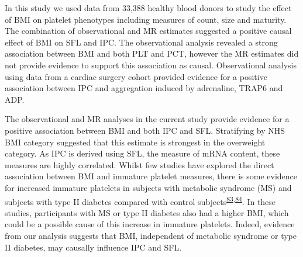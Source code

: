 \documentclass[11pt,twoside]{bristolthesis}
\begin{document}
In this study we used data from 33,388 healthy blood donors to study the effect of BMI on platelet phenotypes including measures of count, size and maturity. The combination of observational and MR estimates suggested a positive causal effect of BMI on SFL and IPC. The observational analysis revealed a strong association between BMI and both PLT and PCT, however the MR estimates did not provide evidence to support this association as causal. Observational analysis using data from a cardiac surgery cohort provided evidence for a positive association between IPC and aggregation induced by adrenaline, TRAP6 and ADP.

The observational and MR analyses in the current study provide evidence for a positive association between BMI and both IPC and SFL. Stratifying by NHS BMI category suggested that this estimate is strongest in the overweight category. As IPC is derived using SFL, the measure of mRNA content, these measures are highly correlated. Whilst few studies have explored the direct association between BMI and immature platelet measures, there is some evidence for increased immature platelets in subjects with metabolic syndrome (MS) and subjects with type II diabetes compared with control subjects\textsuperscript{\protect\hyperlink{ref-Vaduganathan2008a}{83},\protect\hyperlink{ref-Mijovic2015a}{84}}. In these studies, participants with MS or type II diabetes also had a higher BMI, which could be a possible cause of this increase in immature platelets. Indeed, evidence from our analysis suggests that BMI, independent of metabolic syndrome or type II diabetes, may causally influence IPC and SFL.
\end{document}
